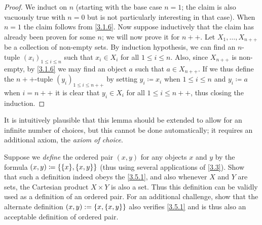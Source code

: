 \begin{proof}
	We induct on \(n\) (starting with the base case \(n = 1\); the claim is also vacuously true with \(n = 0\) but is not particularly interesting in that case).
	When \(n = 1\) the claim follows from \cref{3.1.6}.
	Now suppose inductively that the claim has already been proven for some \(n\);
	we will now prove it for \(n++\).
	Let \(X_1, \dots, X_{n++}\) be a collection of non-empty sets.
	By induction hypothesis, we can find an \(n\)-tuple \((x_i)_{1 \leq i \leq n}\) such that \(x_i \in X_i\) for all \(1 \leq i \leq n\).
	Also, since \(X_{n++}\) is non-empty, by \cref{3.1.6} we may find an object \(a\) such that \(a \in X_{n++}\).
	If we thus define the \(n++\)-tuple \((y_i)_{1 \leq i \leq n++}\) by setting \(y_i \coloneqq x_i\) when \(1 \leq i \leq n\) and \(y_i \coloneqq a\) when \(i = n++\) it is clear that \(y_i \in X_i\) for all \(1 \leq i \leq n++\), thus closing the induction.
\end{proof}

\begin{rmk}\label{3.5.13}
	It is intuitively plausible that this lemma should be extended to allow for an infinite number of choices, but this cannot be done automatically;
	it requires an additional axiom, the \emph{axiom of choice}.
\end{rmk}

\exercisesection

\begin{ex}\label{ex:3.5.1}
	Suppose we \emph{define} the ordered pair \((x, y)\) for any objects \(x\) and \(y\) by the formula \((x, y) \coloneqq \set{\set{x}, \set{x, y}}\)
	(thus using several applications of \cref{3.3}).
	Show that such a definition indeed obeys the \cref{3.5.1}, and also whenever \(X\) and \(Y\) are sets, the Cartesian product \(X \times Y\) is also a set.
	Thus this definition can be validly used as a definition of an ordered pair.
	For an additional challenge, show that the alternate definition \((x, y) := \left\lbrace x, \left\lbrace x, y\right\rbrace\right\rbrace\) also verifies \cref{3.5.1} and is thus also an acceptable definition of ordered pair.
\end{ex}

